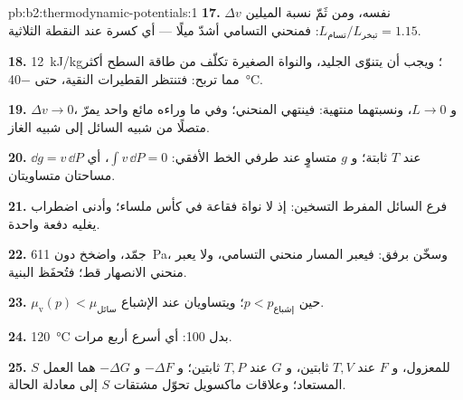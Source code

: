 \begin{solution}{pb:b2:thermodynamic-potentials:1}
\textbf{17.} $\Delta v$ نفسه، ومن ثَمّ نسبة الميلين $L_{\text{تسام}}/L_{\text{تبخر}}
= 1.15$: فمنحني التسامي أشدّ ميلًا --- أي كسرة عند النقطة الثلاثية.

\textbf{18.} \qty{12}{kJ/kg}؛ ويجب أن يتنوّى الجليد، والنواة الصغيرة تكلّف
من طاقة السطح أكثر مما تربح: فتنتظر القطيرات النقية، حتى
\qty{-40}{\celsius}.

\textbf{19.} $\Delta v \to 0$، و $L \to 0$، ونسبتهما منتهية: فينتهي المنحني؛
وفي ما وراءه مائع واحد يمرّ متصلًا من شبيه السائل إلى شبيه الغاز.

\textbf{20.} $\dd g = v\,\dd P$ عند $T$ ثابتة؛ و $g$ متساوٍ عند طرفي
الخط الأفقي: $\int v\,\dd P = 0$، أي مساحتان متساويتان.

\textbf{21.} فرع السائل المفرط التسخين: إذ لا نواة فقاعة في
كأس ملساء؛ وأدنى اضطراب يغليه دفعة واحدة.

\textbf{22.} جمّد، واضخخ دون \qty{611}{Pa}، وسخّن برفق: فيعبر المسار
منحني التسامي، ولا يعبر منحني الانصهار قط؛ فتُحفَظ
البنية.

\textbf{23.} $\mu_{\text{v}}(p) < \mu_{\text{سائل}}$ حين $p < p_{\text{إشباع}}$؛ ويتساويان عند
الإشباع.

\textbf{24.} \qty{120}{\celsius} بدل \qty{100}{}: أي أسرع أربع مرات.

\textbf{25.} $S$ للمعزول، و $F$ عند $T,V$ ثابتين، و $G$ عند $T,P$ ثابتين؛
و $-\Delta F$ و $-\Delta G$ هما العمل المستعاد؛ وعلاقات ماكسويل تحوّل
مشتقات $S$ إلى معادلة الحالة.
\end{solution}
